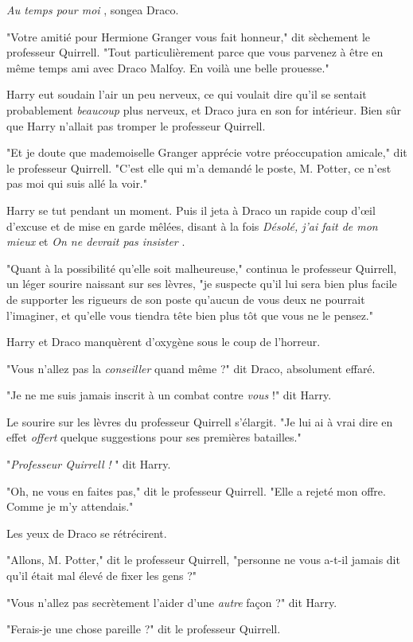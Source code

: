 \emph{Au temps pour moi} , songea Draco.

"Votre amitié pour Hermione Granger vous fait honneur," dit sèchement le professeur Quirrell. "Tout particulièrement parce que vous parvenez à être en même temps ami avec Draco Malfoy. En voilà une belle prouesse."

Harry eut soudain l'air un peu nerveux, ce qui voulait dire qu'il se sentait probablement \emph{beaucoup}  plus nerveux, et Draco jura en son for intérieur. Bien sûr que Harry n'allait pas tromper le professeur Quirrell.

"Et je doute que mademoiselle Granger apprécie votre préoccupation amicale," dit le professeur Quirrell. "C'est elle qui m'a demandé le poste, M. Potter, ce n'est pas moi qui suis allé la voir."

Harry se tut pendant un moment. Puis il jeta à Draco un rapide coup d'œil d'excuse et de mise en garde mêlées, disant à la fois \emph{Désolé, j'ai fait de mon mieux}  et \emph{On ne devrait pas insister} .

"Quant à la possibilité qu'elle soit malheureuse," continua le professeur Quirrell, un léger sourire naissant sur ses lèvres, "je suspecte qu'il lui sera bien plus facile de supporter les rigueurs de son poste qu'aucun de vous deux ne pourrait l'imaginer, et qu'elle vous tiendra tête bien plus tôt que vous ne le pensez."

Harry et Draco manquèrent d'oxygène sous le coup de l'horreur.

"Vous n'allez pas la \emph{conseiller}  quand même ?" dit Draco, absolument effaré.

"Je ne me suis jamais inscrit à un combat contre \emph{vous}  !" dit Harry.

Le sourire sur les lèvres du professeur Quirrell s'élargit. "Je lui ai à vrai dire en effet \emph{offert}  quelque suggestions pour ses premières batailles."

"\emph{Professeur Quirrell}  \emph{!} " dit Harry.

"Oh, ne vous en faites pas," dit le professeur Quirrell. "Elle a rejeté mon offre. Comme je m'y attendais."

Les yeux de Draco se rétrécirent.

"Allons, M. Potter," dit le professeur Quirrell, "personne ne vous a-t-il jamais dit qu'il était mal élevé de fixer les gens ?"

"Vous n'allez pas secrètement l'aider d'une \emph{autre } façon ?" dit Harry.

"Ferais-je une chose pareille ?" dit le professeur Quirrell.

